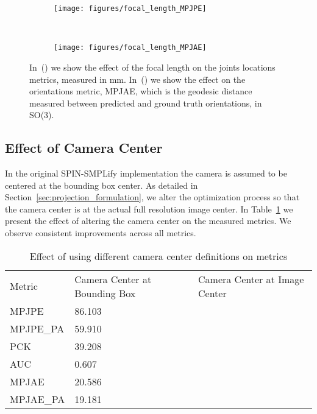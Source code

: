 \documentclass[runningheads]{llncs}
\begin{document}
\begin{figure}
	
	\begin{subfigure}[t]{0.5\textwidth}
		\texttt{[image: figures/focal\_length\_MPJPE]}
		\centering
\caption{}
		\label{fig:focal_length_MPJPE}
	\end{subfigure}
	~
	\begin{subfigure}[t]{0.5\textwidth}
		\texttt{[image: figures/focal\_length\_MPJAE]}
		\centering
\caption{}
		\label{fig:focal_length_MPJAE}
	\end{subfigure}
	\caption{In~() we show the effect of the focal length on the joints locations metrics, measured in mm. In~() we show the effect on the orientations metric, MPJAE, which is the geodesic distance measured between predicted and ground truth orientations, in SO(3).}
	\label{fig:focal_length}
\end{figure}

\subsection{Effect of Camera Center}

In the original SPIN-SMPLify implementation the camera is assumed to be centered at the bounding box center. As detailed in Section~\ref{sec:projection_formulation}, we alter the optimization process so that the camera center is at the actual full resolution image center. In Table~\ref{table:camera_center} we present the effect of altering the camera center on the measured metrics. We observe consistent improvements across all metrics.

\setlength{\tabcolsep}{4pt}
\begin{table}
	\begin{center}
		\caption{Effect of using different camera center definitions on metrics}
		\label{table:camera_center}
		\begin{tabular}{lll}
			\hline\noalign{\smallskip}
			Metric & Camera Center at Bounding Box & Camera Center at Image Center\\
			\noalign{\smallskip}
			\hline
			\noalign{\smallskip}
			MPJPE  & 86.103 & \\
			{MPJPE\_PA} & 59.910 & \\
			PCK & 39.208 & \\
			AUC & 0.607 & \\
			MPJAE & 20.586 & \\
			{MPJAE\_PA} & 19.181 & \\
			\hline
		\end{tabular}
	\end{center}
\end{table}
\setlength{\tabcolsep}{1.4pt}
\end{document}
